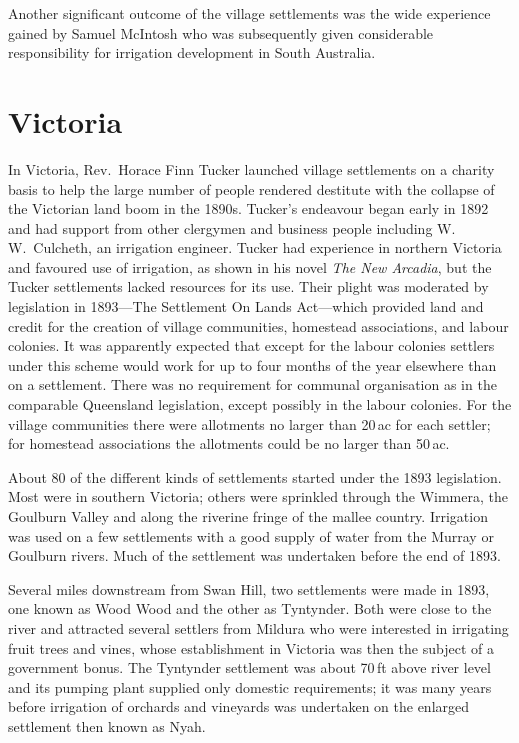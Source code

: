 Another significant outcome of the village settlements was the wide
experience gained by Samuel McIntosh who was subsequently given
considerable responsibility for irrigation development in South
Australia.

\section*{Victoria}

In Victoria, Rev.~Horace Finn Tucker launched village settlements on a
charity basis to help the large number of people rendered destitute
with the collapse of the Victorian land boom in the 1890s.  Tucker's
endeavour began early in 1892 and had support from other clergymen and
business people including W.\,W.~Culcheth, an irrigation engineer.
Tucker had experience in northern Victoria and favoured use of
irrigation, as shown in his novel \textsl{The New Arcadia}, but the
Tucker settlements lacked resources for its use.  Their plight was
moderated by legislation in 1893---The Settlement On Lands Act---which
provided land and credit for the creation of village communities,
homestead associations, and labour colonies.  It was apparently
expected that except for the labour colonies settlers under this
scheme would work for up to four months of the year elsewhere than on
a settlement.  There was no requirement for communal organisation as
in the comparable Queensland legislation, except possibly in the
labour colonies.  For the village communities there were allotments no
larger than 20\,ac for each settler; for homestead associations the
allotments could be no larger than 50\,ac.

About 80 of the different kinds of settlements started under the 1893
legislation.  Most were in southern Victoria; others were sprinkled
through the Wimmera, the Goulburn Valley and along the riverine fringe
of the mallee country.  Irrigation was used on a few settlements with
a good supply of water from the Murray or Goulburn rivers.  Much of
the settlement was undertaken before the end of 1893.

Several miles downstream from Swan Hill, two settlements were made in
1893, one known as Wood Wood and the other as Tyntynder.  Both were
close to the river and attracted several settlers from Mildura who
were interested in irrigating fruit trees and vines, whose
establishment in Victoria was then the subject of a government bonus.
The Tyntynder settlement was about 70\,ft above river level and its
pumping plant supplied only domestic requirements; it was many years
before irrigation of orchards and vineyards was undertaken on the
enlarged settlement then known as
Nyah.

